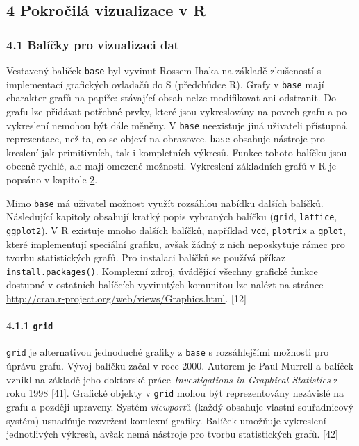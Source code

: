 \documentclass[12pt,]{article}
\let\oldparagraph\paragraph
\renewcommand{\paragraph}[1]{\oldparagraph{#1}\mbox{}}
\begin{document}
\subsection{4 Pokročilá vizualizace v
R}\label{pokrocila-vizualizace-v-r}

\hypertarget{base}{\subsubsection{4.1 Balíčky pro vizualizaci
dat}\label{base}}

\qquad Vestavený balíček \texttt{base} byl vyvinut Rossem Ihaka na
základě zkušeností s implementací grafických ovladačů do S (předchůdce
R). Grafy v \texttt{base} mají charakter grafů na papíře: stávající
obsah nelze modifikovat ani odstranit. Do grafu lze přidávat potřebné
prvky, které jsou vykreslovány na povrch grafu a po vykreslení nemohou
být dále měněny. V \texttt{base} neexistuje jiná uživateli přístupná
reprezentace, než ta, co se objeví na obrazovce. \texttt{base} obsahuje
nástroje pro kreslení jak primitivních, tak i kompletních výkresů.
Funkce tohoto balíčku jsou obecně rychlé, ale mají omezené možnosti.
Vykreslení základních grafů v R je popsáno v kapitole
\protect\hyperlink{base}{2}.

\qquad Mimo \texttt{base} má uživatel možnost využít rozsáhlou nabídku
dalších balíčků. Následující kapitoly obsahují kratký popis vybraných
balíčku (\texttt{grid}, \texttt{lattice}, \texttt{ggplot2}). V R
existuje mnoho dalších balíčků, například \texttt{vcd}, \texttt{plotrix}
a \texttt{gplot}, které implementují speciální grafiku, avšak žádný z
nich neposkytuje rámec pro tvorbu statistických grafů. Pro instalaci
balíčků se používá příkaz \texttt{install.packages()}. Komplexní zdroj,
úvádějící všechny grafické funkce dostupné v ostatních balíčcích
vyvinutých komunitou lze nalézt na stránce
\url{http://cran.r-project.org/web/views/Graphics.html}. {[}12{]}

\paragraph{\texorpdfstring{4.1.1 \texttt{grid}}{4.1.1 grid}}\label{grid}

\qquad \texttt{grid} je alternativou jednoduché grafiky z \texttt{base}
s rozsáhlejšími možnosti pro úprávu grafu. Vývoj balíčku začal v roce
2000. Autorem je Paul Murrell a balíček vznikl na základě jeho doktorské
práce \emph{Investigations in Graphical Statistics} z roku 1998
{[}41{]}. Grafické objekty v \texttt{grid} mohou být reprezentovány
nezávislé na grafu a později upraveny. Systém \emph{viewport}ů (každý
obsahuje vlastní souřadnicový systém) usnadňuje rozvržení komlexní
grafiky. Balíček umožňuje vykreslení jednotlivých výkresů, avšak nemá
nástroje pro tvorbu statistických grafů. {[}42{]}
\end{document}
